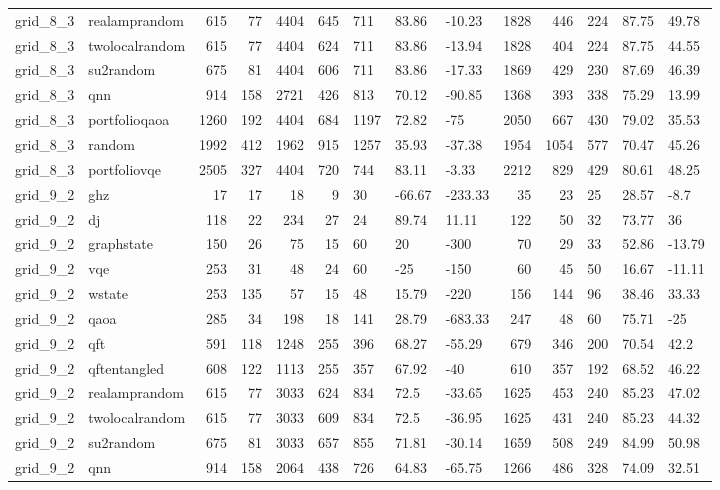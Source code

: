 \begin{longtable}{llrrrrlllrrlll}
grid\_8\_3 & realamprandom & 615 & 77 & 4404 & 645 & 711 & 83.86 & -10.23 & 1828 & 446 & 224 & 87.75 & 49.78 \\
grid\_8\_3 & twolocalrandom & 615 & 77 & 4404 & 624 & 711 & 83.86 & -13.94 & 1828 & 404 & 224 & 87.75 & 44.55 \\
grid\_8\_3 & su2random & 675 & 81 & 4404 & 606 & 711 & 83.86 & -17.33 & 1869 & 429 & 230 & 87.69 & 46.39 \\
grid\_8\_3 & qnn & 914 & 158 & 2721 & 426 & 813 & 70.12 & -90.85 & 1368 & 393 & 338 & 75.29 & 13.99 \\
grid\_8\_3 & portfolioqaoa & 1260 & 192 & 4404 & 684 & 1197 & 72.82 & -75 & 2050 & 667 & 430 & 79.02 & 35.53 \\
grid\_8\_3 & random & 1992 & 412 & 1962 & 915 & 1257 & 35.93 & -37.38 & 1954 & 1054 & 577 & 70.47 & 45.26 \\
grid\_8\_3 & portfoliovqe & 2505 & 327 & 4404 & 720 & 744 & 83.11 & -3.33 & 2212 & 829 & 429 & 80.61 & 48.25 \\
grid\_9\_2 & ghz & 17 & 17 & 18 & 9 & 30 & -66.67 & -233.33 & 35 & 23 & 25 & 28.57 & -8.7 \\
grid\_9\_2 & dj & 118 & 22 & 234 & 27 & 24 & 89.74 & 11.11 & 122 & 50 & 32 & 73.77 & 36 \\
grid\_9\_2 & graphstate & 150 & 26 & 75 & 15 & 60 & 20 & -300 & 70 & 29 & 33 & 52.86 & -13.79 \\
grid\_9\_2 & vqe & 253 & 31 & 48 & 24 & 60 & -25 & -150 & 60 & 45 & 50 & 16.67 & -11.11 \\
grid\_9\_2 & wstate & 253 & 135 & 57 & 15 & 48 & 15.79 & -220 & 156 & 144 & 96 & 38.46 & 33.33 \\
grid\_9\_2 & qaoa & 285 & 34 & 198 & 18 & 141 & 28.79 & -683.33 & 247 & 48 & 60 & 75.71 & -25 \\
grid\_9\_2 & qft & 591 & 118 & 1248 & 255 & 396 & 68.27 & -55.29 & 679 & 346 & 200 & 70.54 & 42.2 \\
grid\_9\_2 & qftentangled & 608 & 122 & 1113 & 255 & 357 & 67.92 & -40 & 610 & 357 & 192 & 68.52 & 46.22 \\
grid\_9\_2 & realamprandom & 615 & 77 & 3033 & 624 & 834 & 72.5 & -33.65 & 1625 & 453 & 240 & 85.23 & 47.02 \\
grid\_9\_2 & twolocalrandom & 615 & 77 & 3033 & 609 & 834 & 72.5 & -36.95 & 1625 & 431 & 240 & 85.23 & 44.32 \\
grid\_9\_2 & su2random & 675 & 81 & 3033 & 657 & 855 & 71.81 & -30.14 & 1659 & 508 & 249 & 84.99 & 50.98 \\
grid\_9\_2 & qnn & 914 & 158 & 2064 & 438 & 726 & 64.83 & -65.75 & 1266 & 486 & 328 & 74.09 & 32.51 \\

\end{longtable}
